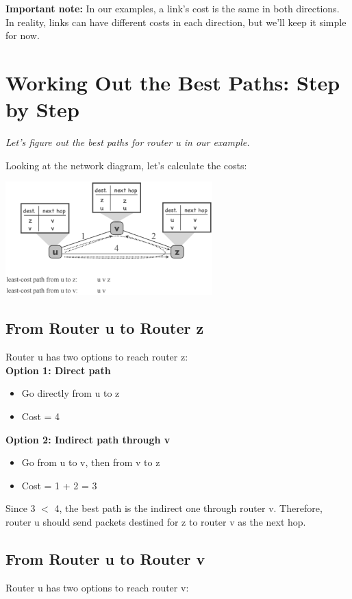 \documentclass[../../compsys.tex]{subfiles}
\begin{document}
\textbf{Important note:} In our examples, a link's cost is the same in both directions. In reality, links can have different costs in each direction, but we'll keep it simple for now.

\section{Working Out the Best Paths: Step by Step}
\textit{Let's figure out the best paths for router u in our example.}

Looking at the network diagram, let's calculate the costs:

\begin{center}
    \includegraphics[width=0.6\textwidth]{images/example-table-routers.png}
\end{center}

\subsection{From Router u to Router z}
Router u has two options to reach router z:\\[10px]
\textbf{Option 1: Direct path}
\begin{itemize}
    \item Go directly from u to z
    \item Cost = 4
\end{itemize}

\textbf{Option 2: Indirect path through v}
\begin{itemize}
    \item Go from u to v, then from v to z
    \item Cost = 1 + 2 = 3
\end{itemize}

Since 3 $<$ 4, the best path is the indirect one through router v.
Therefore, router u should send packets destined for z to router v as the next hop.

\subsection{From Router u to Router v}
Router u has two options to reach router v:
\end{document}
